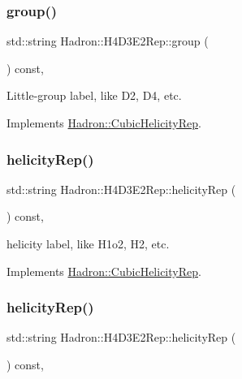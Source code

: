\subsubsection{\texorpdfstring{group()}{group()}\hspace{0.1cm}{\footnotesize\ttfamily [5/5]}}
{\footnotesize\ttfamily std\+::string Hadron\+::\+H4\+D3\+E2\+Rep\+::group (\begin{DoxyParamCaption}{ }\end{DoxyParamCaption}) const\hspace{0.3cm}{\ttfamily [inline]}, {\ttfamily [virtual]}}

Little-\/group label, like D2, D4, etc. 

Implements \mbox{\hyperlink{structHadron_1_1CubicHelicityRep_a101a7d76cd8ccdad0f272db44b766113}{Hadron\+::\+Cubic\+Helicity\+Rep}}.

\mbox{\label{structHadron_1_1H4D3E2Rep_a79e0c262ae365b9efabe080707d034a8}} 
\subsubsection{\texorpdfstring{helicityRep()}{helicityRep()}\hspace{0.1cm}{\footnotesize\ttfamily [1/3]}}
{\footnotesize\ttfamily std\+::string Hadron\+::\+H4\+D3\+E2\+Rep\+::helicity\+Rep (\begin{DoxyParamCaption}{ }\end{DoxyParamCaption}) const\hspace{0.3cm}{\ttfamily [inline]}, {\ttfamily [virtual]}}

helicity label, like H1o2, H2, etc. 

Implements \mbox{\hyperlink{structHadron_1_1CubicHelicityRep_af1096946b7470edf0a55451cc662f231}{Hadron\+::\+Cubic\+Helicity\+Rep}}.

\mbox{\label{structHadron_1_1H4D3E2Rep_a79e0c262ae365b9efabe080707d034a8}} 
\subsubsection{\texorpdfstring{helicityRep()}{helicityRep()}\hspace{0.1cm}{\footnotesize\ttfamily [2/3]}}
{\footnotesize\ttfamily std\+::string Hadron\+::\+H4\+D3\+E2\+Rep\+::helicity\+Rep (\begin{DoxyParamCaption}{ }\end{DoxyParamCaption}) const\hspace{0.3cm}{\ttfamily [inline]}, {\ttfamily [virtual]}}

